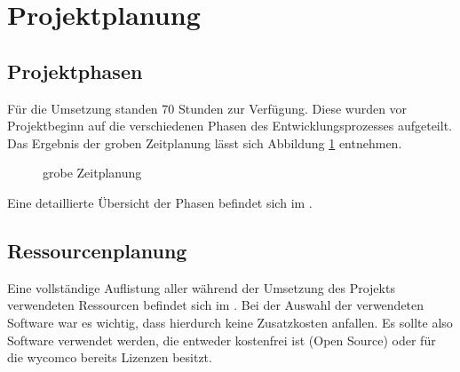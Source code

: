 \section{Projektplanung} 
\label{sec:Projektplanung}
\subsection{Projektphasen}
\label{sec:Projektphasen}
Für die Umsetzung standen 70 Stunden zur Verfügung. Diese wurden vor Projektbeginn auf die verschiedenen Phasen des Entwicklungsprozesses aufgeteilt. 
Das Ergebnis der groben Zeitplanung lässt sich Abbildung \ref{fig:timeline} entnehmen. 
\begin{figure}[htb]
\centering
{}
\caption{grobe Zeitplanung}
\label{fig:timeline}
\end{figure}
Eine detaillierte Übersicht der Phasen befindet sich im .
\subsection{Ressourcenplanung}
\label{sec:Ressourcenplanung}

Eine vollständige Auflistung aller während der Umsetzung des Projekts verwendeten Ressourcen befindet sich im . Bei der Auswahl der verwendeten Software war es wichtig, dass hierdurch keine Zusatzkosten anfallen. Es sollte also Software verwendet werden, die entweder kostenfrei ist (\zB Open Source) oder für die wycomco bereits Lizenzen besitzt.
